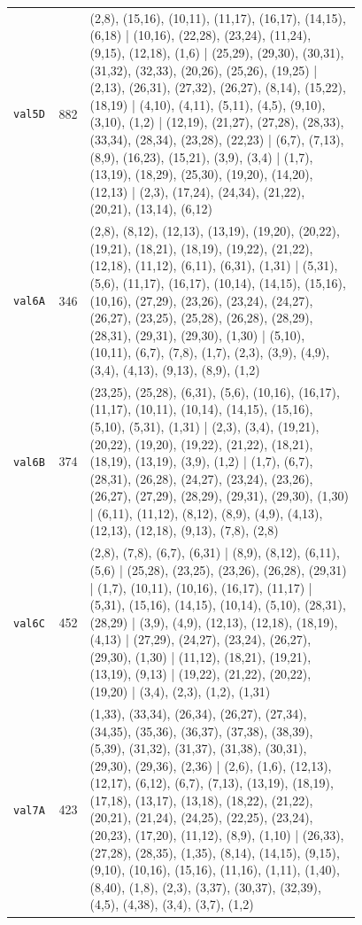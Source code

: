 \begin{landscape}
\begin{longtable}{lr>{\tiny\raggedright\arraybackslash}p{0.78\linewidth}}
\texttt{val5D} & 882 & (2,8), (15,16), (10,11), (11,17), (16,17), (14,15), (6,18) | (10,16), (22,28), (23,24), (11,24), (9,15), (12,18), (1,6) | (25,29), (29,30), (30,31), (31,32), (32,33), (20,26), (25,26), (19,25) | (2,13), (26,31), (27,32), (26,27), (8,14), (15,22), (18,19) | (4,10), (4,11), (5,11), (4,5), (9,10), (3,10), (1,2) | (12,19), (21,27), (27,28), (28,33), (33,34), (28,34), (23,28), (22,23) | (6,7), (7,13), (8,9), (16,23), (15,21), (3,9), (3,4) | (1,7), (13,19), (18,29), (25,30), (19,20), (14,20), (12,13) | (2,3), (17,24), (24,34), (21,22), (20,21), (13,14), (6,12) \\[2pt]
\texttt{val6A} & 346 & (2,8), (8,12), (12,13), (13,19), (19,20), (20,22), (19,21), (18,21), (18,19), (19,22), (21,22), (12,18), (11,12), (6,11), (6,31), (1,31) | (5,31), (5,6), (11,17), (16,17), (10,14), (14,15), (15,16), (10,16), (27,29), (23,26), (23,24), (24,27), (26,27), (23,25), (25,28), (26,28), (28,29), (28,31), (29,31), (29,30), (1,30) | (5,10), (10,11), (6,7), (7,8), (1,7), (2,3), (3,9), (4,9), (3,4), (4,13), (9,13), (8,9), (1,2) \\[2pt]
\texttt{val6B} & 374 & (23,25), (25,28), (6,31), (5,6), (10,16), (16,17), (11,17), (10,11), (10,14), (14,15), (15,16), (5,10), (5,31), (1,31) | (2,3), (3,4), (19,21), (20,22), (19,20), (19,22), (21,22), (18,21), (18,19), (13,19), (3,9), (1,2) | (1,7), (6,7), (28,31), (26,28), (24,27), (23,24), (23,26), (26,27), (27,29), (28,29), (29,31), (29,30), (1,30) | (6,11), (11,12), (8,12), (8,9), (4,9), (4,13), (12,13), (12,18), (9,13), (7,8), (2,8) \\[2pt]
\texttt{val6C} & 452 & (2,8), (7,8), (6,7), (6,31) | (8,9), (8,12), (6,11), (5,6) | (25,28), (23,25), (23,26), (26,28), (29,31) | (1,7), (10,11), (10,16), (16,17), (11,17) | (5,31), (15,16), (14,15), (10,14), (5,10), (28,31), (28,29) | (3,9), (4,9), (12,13), (12,18), (18,19), (4,13) | (27,29), (24,27), (23,24), (26,27), (29,30), (1,30) | (11,12), (18,21), (19,21), (13,19), (9,13) | (19,22), (21,22), (20,22), (19,20) | (3,4), (2,3), (1,2), (1,31) \\[2pt]
\texttt{val7A} & 423 & (1,33), (33,34), (26,34), (26,27), (27,34), (34,35), (35,36), (36,37), (37,38), (38,39), (5,39), (31,32), (31,37), (31,38), (30,31), (29,30), (29,36), (2,36) | (2,6), (1,6), (12,13), (12,17), (6,12), (6,7), (7,13), (13,19), (18,19), (17,18), (13,17), (13,18), (18,22), (21,22), (20,21), (21,24), (24,25), (22,25), (23,24), (20,23), (17,20), (11,12), (8,9), (1,10) | (26,33), (27,28), (28,35), (1,35), (8,14), (14,15), (9,15), (9,10), (10,16), (15,16), (11,16), (1,11), (1,40), (8,40), (1,8), (2,3), (3,37), (30,37), (32,39), (4,5), (4,38), (3,4), (3,7), (1,2) \\[2pt]

\end{longtable}
\end{landscape}
